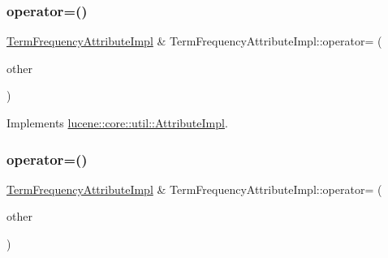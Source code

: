 \subsubsection{\texorpdfstring{operator=()}{operator=()}\hspace{0.1cm}{\footnotesize\ttfamily [1/2]}}
{\footnotesize\ttfamily \mbox{\hyperlink{classlucene_1_1core_1_1analysis_1_1tokenattributes_1_1TermFrequencyAttributeImpl}{Term\+Frequency\+Attribute\+Impl}} \& Term\+Frequency\+Attribute\+Impl\+::operator= (\begin{DoxyParamCaption}\item[{const \mbox{\hyperlink{classlucene_1_1core_1_1util_1_1AttributeImpl}{lucene\+::core\+::util\+::\+Attribute\+Impl}} \&}]{other }\end{DoxyParamCaption})\hspace{0.3cm}{\ttfamily [virtual]}}



Implements \mbox{\hyperlink{classlucene_1_1core_1_1util_1_1AttributeImpl_ab032e399d03ce2f58c76881cf2b92325}{lucene\+::core\+::util\+::\+Attribute\+Impl}}.

\mbox{\label{classlucene_1_1core_1_1analysis_1_1tokenattributes_1_1TermFrequencyAttributeImpl_afb31133bdba35cd3e19bbe1aefed9908}} 
\subsubsection{\texorpdfstring{operator=()}{operator=()}\hspace{0.1cm}{\footnotesize\ttfamily [2/2]}}
{\footnotesize\ttfamily \mbox{\hyperlink{classlucene_1_1core_1_1analysis_1_1tokenattributes_1_1TermFrequencyAttributeImpl}{Term\+Frequency\+Attribute\+Impl}} \& Term\+Frequency\+Attribute\+Impl\+::operator= (\begin{DoxyParamCaption}\item[{const \mbox{\hyperlink{classlucene_1_1core_1_1analysis_1_1tokenattributes_1_1TermFrequencyAttributeImpl}{Term\+Frequency\+Attribute\+Impl}} \&}]{other }\end{DoxyParamCaption})}

